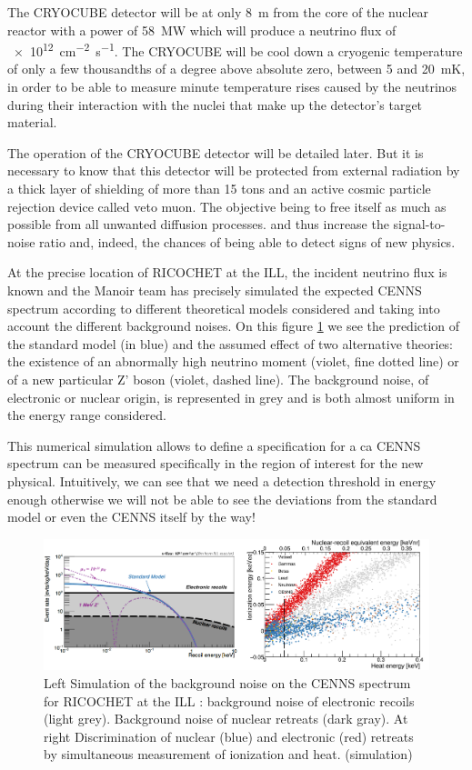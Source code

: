 The CRYOCUBE detector will be at only \SI{8}{\m} from the core of the nuclear reactor with a power of \SI{58}{\mega\watt} which will produce a neutrino flux of \SI{e12}{\cm^{-2} \s^{-1}}. The CRYOCUBE will be cool down a cryogenic temperature of only a few thousandths of a degree above absolute zero, between 5 and \SI{20}{\milli\kelvin}, in order to be able to measure minute temperature rises caused by the neutrinos during their interaction with the nuclei that make up the detector's target material.

The operation of the CRYOCUBE detector will be detailed later. But it is necessary to know that this detector will be protected from external radiation by a thick layer of shielding of more than 15 tons and an active cosmic particle rejection device called veto muon. The objective being to free itself as much as possible from all unwanted diffusion processes. and thus increase the signal-to-noise ratio and, indeed, the chances of being able to detect signs of new physics.

At the precise location of RICOCHET at the ILL, the incident neutrino flux is known and
the Manoir team has precisely simulated the expected CENNS spectrum according to different theoretical models considered and taking into account the different background noises. On this figure \ref{fig:cenns-new-physics} we see the prediction of the standard model (in blue) and the assumed effect of two alternative theories: the existence of an abnormally high neutrino moment (violet, fine dotted line) or of a new particular Z' boson (violet, dashed line). The background noise, of electronic or nuclear origin, is represented in grey and is both almost uniform in the energy range considered.

This numerical simulation allows to define a specification for a ca CENNS spectrum can be measured specifically in the region of interest for the new physical. Intuitively, we can see that we need a detection threshold in energy enough otherwise we will not be able to see the deviations from the standard model or even the CENNS itself by the way!

\begin{figure}
\centering
\includegraphics[scale=1]{Figures/Introduction/cenns_new_physics.png}
\caption{Left Simulation of the background noise on the CENNS spectrum for RICOCHET at the ILL : background noise of electronic recoils (light grey). Background noise of nuclear retreats (dark gray). At right Discrimination of nuclear (blue) and electronic (red) retreats
by simultaneous measurement of ionization and heat. (simulation)}
\label{fig:cenns-new-physics}
\end{figure}

